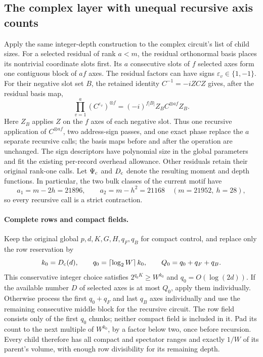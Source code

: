 \subsection{The complex layer with unequal recursive axis counts}
\label{sec:mixed-complex-layer}

Apply the same integer-depth construction to the complex circuit's list
of child sizes.  For a selected residual of rank $a<m$, the residual
orthonormal basis places its nontrivial coordinate slots first.  Its
$a$ consecutive slots of $f$ selected axes form one contiguous block of
$af$ axes.  The residual factors can have signs $\varepsilon_v\in\{1,-1\}$.
For their negative slot set $B$, the retained identity
$C^{-1}=-iZCZ$ gives, after the residual basis map,
\[
 \prod_{v=1}^{a}(C^{\varepsilon_v})^{\otimes f}
   =(-i)^{f|B|}Z_B C^{\otimes af}Z_B.
\]
Here $Z_B$ applies $Z$ on the $f$ axes of each negative slot.
Thus one recursive application of $C^{\otimes af}$, two address-sign
passes, and one exact phase replace the $a$ separate recursive calls;
the basis maps before and after the operation are unchanged.
The sign descriptors have polynomial size in the global parameters and
fit the existing per-record overhead allowance.  Other residuals retain their original
rank-one calls.  Let $\Psi_{\rm c}$ and $D_{\rm c}$ denote the resulting
moment and depth functions.  In particular, the two bulk classes of the
current motif have
\[
 a_1=m-2h=21896,\qquad a_2=m-h^2=21168
 \quad(m=21952,\ h=28),
\]
so every recursive call is a strict contraction.

\paragraph{Complete rows and compact fields.}
Keep the original global $p,d,K,G,H,q_F,q_B$ for compact control, and
replace only the row reservation by
\[
 k_0=D_{\rm c}(d),\qquad
 q_0=\lceil\log_2 W\rceil\,k_0,
 \qquad Q_0=q_0+q_F+q_B.
\]
This conservative integer choice satisfies
$2^{q_0K}\ge W^{k_0}$ and $q_0=O(\log(2d))$.
If the available number $D$ of selected axes is at most $Q_0$, apply them
individually.  Otherwise process the first $q_0+q_F$ and last $q_B$ axes
individually and use the remaining consecutive middle block for the
recursive circuit.  The row field consists only of the first $q_0$
chunks; neither compact field is included in it.  Pad its count to the
next multiple of $W^{k_0}$, by a factor below two, once before recursion.
Every child therefore has all compact and spectator ranges and exactly
$1/W$ of its parent's volume, with enough row divisibility for its
remaining depth.

